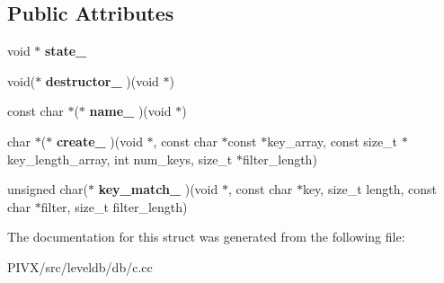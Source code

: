 \subsection*{Public Attributes}
\begin{DoxyCompactItemize}
\item 
\mbox{\label{structleveldb__filterpolicy__t_a35aa5dd2f350f6eafa4ae904e55dcbe2}} 
void $\ast$ {\bfseries state\+\_\+}
\item 
\mbox{\label{structleveldb__filterpolicy__t_ac743c53a14a4061cf30832a1861573ed}} 
void($\ast$ {\bfseries destructor\+\_\+} )(void $\ast$)
\item 
\mbox{\label{structleveldb__filterpolicy__t_a5fbc18ad0916314ffafe205543bad720}} 
const char $\ast$($\ast$ {\bfseries name\+\_\+} )(void $\ast$)
\item 
\mbox{\label{structleveldb__filterpolicy__t_acf8194876ecb2c47ef33cb7a7dec3d8e}} 
char $\ast$($\ast$ {\bfseries create\+\_\+} )(void $\ast$, const char $\ast$const $\ast$key\+\_\+array, const size\+\_\+t $\ast$key\+\_\+length\+\_\+array, int num\+\_\+keys, size\+\_\+t $\ast$filter\+\_\+length)
\item 
\mbox{\label{structleveldb__filterpolicy__t_a453f04cb3420879256c6194b5de0a818}} 
unsigned char($\ast$ {\bfseries key\+\_\+match\+\_\+} )(void $\ast$, const char $\ast$key, size\+\_\+t length, const char $\ast$filter, size\+\_\+t filter\+\_\+length)
\end{DoxyCompactItemize}


The documentation for this struct was generated from the following file\+:\begin{DoxyCompactItemize}
\item 
P\+I\+V\+X/src/leveldb/db/c.\+cc\end{DoxyCompactItemize}
